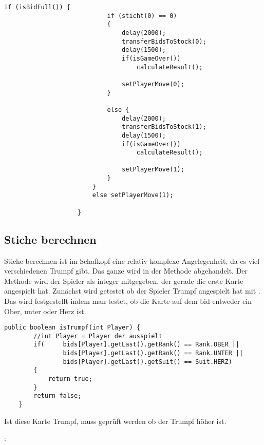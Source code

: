 \begin{lstlisting}[caption={initPlayers gamecycle},captionpos=b]
                    if (isBidFull()) {
                            if (sticht(0) == 0)
                            {
                                delay(2000);
                                transferBidsToStock(0);
                                delay(1500);
                                if(isGameOver())
                                    calculateResult();

                                setPlayerMove(0);
                            }

                            else {
                                delay(2000);
                                transferBidsToStock(1);
                                delay(1500);
                                if(isGameOver())
                                    calculateResult();

                                setPlayerMove(1);
                            }
                        }
                        else setPlayerMove(1);

                    }
\end{lstlisting}
\subsection{Stiche berechnen}
Stiche berechnen ist im Schafkopf eine relativ komplexe Angelegenheit, da es viel verschiedenen Trumpf gibt. Das ganze wird in der Methode  abgehandelt. Der Methode wird der Spieler als integer mitgegeben, der gerade die erste Karte angespielt hat. Zunächst wird getestet ob der Spieler Trumpf angespielt hat mit . Das wird festgestellt indem man  testet, ob die Karte auf dem bid entweder ein Ober, unter oder Herz ist.
\begin{lstlisting}[caption={isTrumpf Methode},captionpos=b]
    public boolean isTrumpf(int Player) {
        //int Player = Player der ausspielt
        if(     bids[Player].getLast().getRank() == Rank.OBER ||
                bids[Player].getLast().getRank() == Rank.UNTER ||
                bids[Player].getLast().getSuit() == Suit.HERZ)
        {
            return true;
        }
        return false;
    }
\end{lstlisting}

Ist diese Karte Trumpf, muss geprüft werden ob der Trumpf höher ist. 

: 

